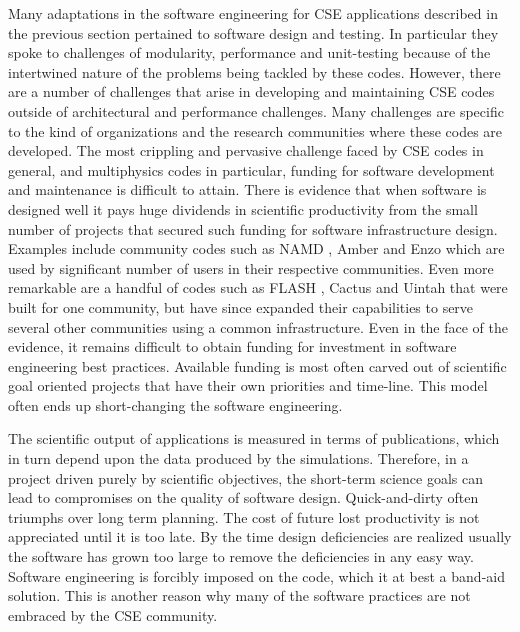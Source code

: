 
\label{sec:instChallenges}
Many adaptations in the software engineering for CSE applications described in the previous
section pertained to software design and testing. In particular they
spoke to challenges of modularity, performance and unit-testing because of the
intertwined nature of the problems being tackled by these
codes. However, there are a number of challenges that arise in developing and maintaining CSE codes outside of architectural and performance challenges.  Many challenges are specific to the kind of organizations and the research communities
where these codes are developed. The most crippling and pervasive
challenge faced by CSE codes in general, and multiphysics codes in
particular, funding for software development and maintenance is difficult to attain. 
There is evidence that when software is designed well
it pays huge dividends in scientific productivity from the
small number of projects that secured such funding for software
infrastructure design. Examples include community codes such as NAMD
\cite{phillips2005scalable}, Amber \cite{case2014amber} and Enzo \cite{Enzo2013} which are used by
significant number of users in their respective communities. Even more
remarkable are a handful of codes such as FLASH \cite{Dubey2009, Dubey2008},
Cactus \cite{blazewiczphysics} and Uintah \cite{uintah2,TGRID10} that were built for one community,
but have since expanded their capabilities to serve several other
communities using a common infrastructure.
Even in the face of the evidence, it remains difficult to obtain
funding for investment in software engineering best practices.
Available funding is most often carved out of scientific goal 
oriented projects that have their own priorities and time-line. This
model often ends up short-changing the software engineering.


The scientific output of applications is measured in terms of publications, which in
turn depend upon the data produced by the simulations. Therefore, in a
project driven purely by scientific objectives, the short-term science
goals can lead to compromises on the quality of software
design. Quick-and-dirty often triumphs over long term planning.   
The cost of future lost productivity is not appreciated until it is too
late. By the time design deficiencies are realized usually the
software has grown too large to remove the deficiencies in any easy
way.  Software engineering is forcibly imposed on the code, which it
at best a band-aid solution. This is another reason why many of the
software practices are not embraced by the CSE community. 

